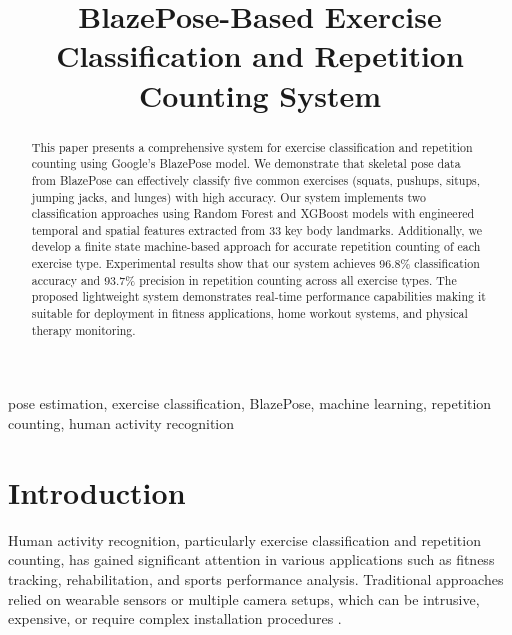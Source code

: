 \documentclass[conference]{IEEEtran}
\begin{document}
\title{BlazePose-Based Exercise Classification and Repetition Counting System}

\author{
}

\maketitle

\begin{abstract}
This paper presents a comprehensive system for exercise classification and repetition counting using Google's BlazePose model. We demonstrate that skeletal pose data from BlazePose can effectively classify five common exercises (squats, pushups, situps, jumping jacks, and lunges) with high accuracy. Our system implements two classification approaches using Random Forest and XGBoost models with engineered temporal and spatial features extracted from 33 key body landmarks. Additionally, we develop a finite state machine-based approach for accurate repetition counting of each exercise type. Experimental results show that our system achieves 96.8\% classification accuracy and 93.7\% precision in repetition counting across all exercise types. The proposed lightweight system demonstrates real-time performance capabilities making it suitable for deployment in fitness applications, home workout systems, and physical therapy monitoring.
\end{abstract}

\begin{IEEEkeywords}
pose estimation, exercise classification, BlazePose, machine learning, repetition counting, human activity recognition
\end{IEEEkeywords}

\section{Introduction}
Human activity recognition, particularly exercise classification and repetition counting, has gained significant attention in various applications such as fitness tracking, rehabilitation, and sports performance analysis. Traditional approaches relied on wearable sensors or multiple camera setups, which can be intrusive, expensive, or require complex installation procedures \cite{har_survey}. 
\end{document}
